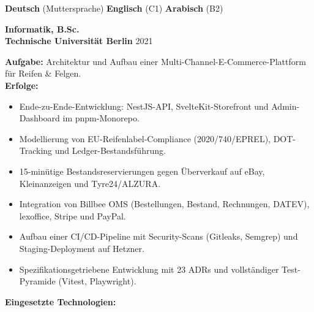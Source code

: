\documentclass[10pt,a4paper,normalphoto]{altacv}
\begin{document}
\begin{fullwidth}
\noindent
\begin{minipage}[t]{0.47\linewidth}
\textcolor{emphasis}{\textbf{Deutsch}} (Muttersprache)\quad
\textcolor{emphasis}{\textbf{Englisch}} (C1)\quad
\textcolor{emphasis}{\textbf{Arabisch}} (B2)
\end{minipage}%
\hfill
\begin{minipage}[t]{0.47\linewidth}
\textcolor{emphasis}{\textbf{Informatik, B.Sc.}}\\
\textcolor{accent}{\textbf{Technische Universität Berlin}} \textperiodcentered{} 2021
\end{minipage}


\textbf{Aufgabe:} Architektur und Aufbau einer Multi-Channel-E-Commerce-Plattform für Reifen \& Felgen.\\
\textbf{Erfolge:}
\begin{itemize}
    \item Ende-zu-Ende-Entwicklung: NestJS-API, SvelteKit-Storefront und Admin-Dashboard im pnpm-Monorepo.
    \item Modellierung von EU-Reifenlabel-Compliance (2020/740/EPREL), DOT-Tracking und Ledger-Bestandsführung.
    \item 15-minütige Bestandsreservierungen gegen Überverkauf auf eBay, Kleinanzeigen und Tyre24/ALZURA.
    \item Integration von Billbee OMS (Bestellungen, Bestand, Rechnungen, DATEV), lexoffice, Stripe und PayPal.
    \item Aufbau einer CI/CD-Pipeline mit Security-Scans (Gitleaks, Semgrep) und Staging-Deployment auf Hetzner.
    \item Spezifikationsgetriebene Entwicklung mit 23 ADRs und vollständiger Test-Pyramide (Vitest, Playwright).
\end{itemize}

\textbf{Eingesetzte Technologien:}\\[0.4em]

\vspace{1em}
\end{fullwidth}
\end{document}
